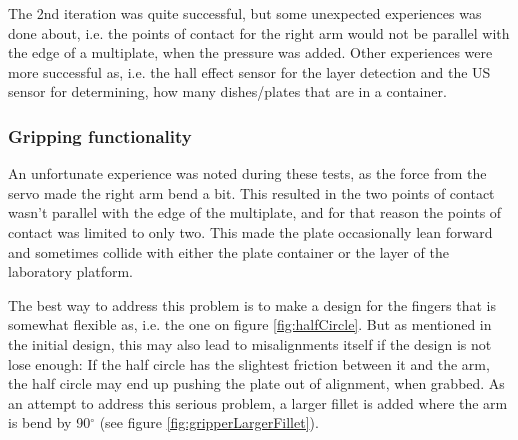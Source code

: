 \documentclass[10pt,a4paper]{article}
\begin{document}
		The 2nd iteration was quite successful, but some unexpected experiences was done about, i.e. the points of contact for the right arm would not be parallel with the edge of a multiplate, when the pressure was added. Other experiences were more successful as, i.e. the hall effect sensor for the layer detection and the US sensor for determining, how many dishes/plates that are in a container.
		
		\subsubsection{Gripping functionality}
		An unfortunate experience was noted during these tests, as the force from the servo made the right arm bend a bit. This resulted in the two points of contact wasn't parallel with the edge of the multiplate, and for that reason the points of contact was limited to only two. This made the plate occasionally lean forward and sometimes collide with either the plate container or the layer of the laboratory platform.
		
	
				
		The best way to address this problem is to make a design for the fingers that is somewhat flexible as, i.e. the one on figure \ref{fig:halfCircle}. But as mentioned in the initial design, this may also lead to misalignments itself if the design is not lose enough: If the half circle has the slightest friction between it and the arm, the half circle may end up pushing the plate out of alignment, when grabbed. As an attempt to address this serious problem, a larger fillet is added where the arm is bend by 90$^{\circ}$ (see figure \ref{fig:gripperLargerFillet}).
			 		
\end{document}
